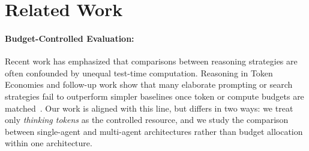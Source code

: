 \documentclass{article} %
\begin{document}
\section{Related Work}

\paragraph{Budget-Controlled Evaluation:}
Recent work has emphasized that comparisons between reasoning strategies are often confounded by unequal test-time computation. Reasoning in Token Economies and follow-up work show that many elaborate prompting or search strategies fail to outperform simpler baselines once token or compute budgets are matched~\citep{wang2024reasoning,han2025token,li2025selfbudgeter,wen2025budgetthinker}. Our work is aligned with this line, but differs in two ways: we treat only \emph{thinking tokens} as the controlled resource, and we study the comparison between single-agent and multi-agent architectures rather than budget allocation within one architecture.
\end{document}
